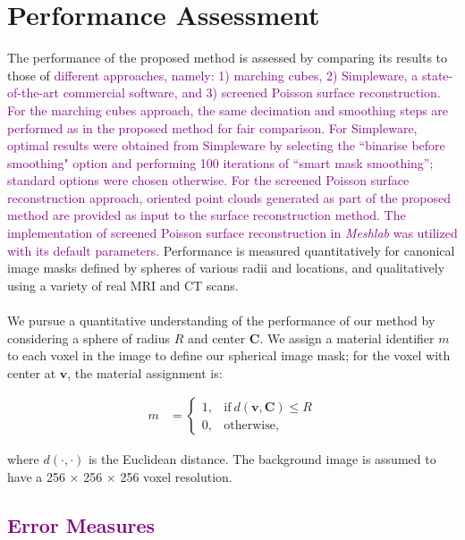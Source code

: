 \section{Performance Assessment}
%

The performance of the proposed method is assessed by comparing its results to those of \textcolor{purple}{different approaches, namely: 1) marching cubes, 2) Simpleware, a state-of-the-art commercial software, and 3) screened Poisson surface reconstruction. For the marching cubes approach, the same decimation and smoothing steps are performed as in the proposed method for fair comparison. For Simpleware, optimal results were obtained from \textcolor{purple}{Simpleware} by selecting the ``binarise before smoothing" option and performing 100 iterations of ``smart mask smoothing''; standard options were chosen otherwise. For the screened Poisson surface reconstruction approach, oriented point clouds generated as part of the proposed method are provided as input to the surface reconstruction method. The implementation of screened Poisson surface reconstruction in \textit{Meshlab} was utilized with its default parameters.} Performance is measured quantitatively for canonical image masks defined by spheres of various radii and locations, and qualitatively using a variety of real MRI and CT scans. \\ \\
%
We pursue a quantitative understanding of the performance of our method by considering a sphere of radius $R$ and center $\bm{C}$.  We assign a material identifier $m$ to each voxel in the image to define our spherical image mask; for the voxel with center at $\bm{v}$, the material assignment is:
\begin{linenomath}\begin{align} 
	m &=  \begin{cases}
		1, & \text{if}\ d \left(\bm{v},\bm{C}\right) \le R \\
		0, & \text{otherwise},
	\end{cases}
\end{align}\end{linenomath}
where $d(\cdot,\cdot)$ is the Euclidean distance. The background image is assumed to have a 256 $\times$ 256 $\times$ 256 voxel resolution.
\subsection{\textcolor{purple}{Error Measures}}
\label{Error Measures}

